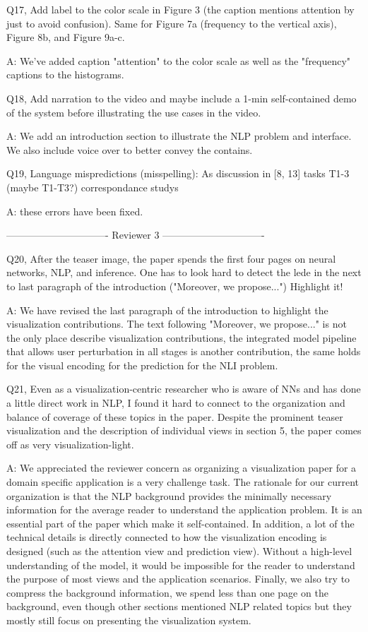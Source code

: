 Q17, Add label to the color scale in Figure 3 (the caption mentions attention by just to avoid confusion). Same for Figure 7a (frequency to the vertical axis), Figure 8b, and Figure 9a-c.

A: We've added caption "attention" to the color scale as well as the "frequency" captions to the histograms.

Q18, Add narration to the video and maybe include a 1-min self-contained demo of the system before illustrating the use cases in the video.

A: We add an introduction section to illustrate the NLP problem and interface. We also include voice over to better convey the contains.

Q19, Language mispredictions (misspelling):
As discussion in [8, 13]
tasks T1-3 (maybe T1-T3?)
correspondance
studys

A: these errors have been fixed.

------------------------------- Reviewer 3 -------------------------------

Q20, After the teaser image, the paper spends the first four pages on neural networks, NLP, and inference. One has to look hard to detect the lede in the next to last paragraph of the introduction ("Moreover, we propose...") Highlight it!

A: We have revised the last paragraph of the introduction to highlight the visualization contributions. The text following "Moreover, we propose..." is not the only place describe visualization contributions, the integrated model pipeline that allows user perturbation in all stages is another contribution, the same holds for the visual encoding for the prediction for the NLI problem.

Q21, Even as a visualization-centric researcher who is aware of NNs and has done a little direct work in NLP, I found it hard to connect to the organization and balance of coverage of these topics in the paper. Despite the prominent teaser visualization and the description of individual views in section 5, the paper comes off as very visualization-light.

A: We appreciated the reviewer concern as organizing a visualization paper for a domain specific application is a very challenge task. The rationale for our current organization is that the NLP background provides the minimally necessary information for the average reader to understand the application problem. It is an essential part of the paper which make it self-contained. In addition, a lot of the technical details is directly connected to how the visualization encoding is designed (such as the attention view and prediction view). Without a high-level understanding of the model, it would be impossible for the reader to understand the purpose of most views and the application scenarios. Finally, we also try to compress the background information, we spend less than one page on the background, even though other sections mentioned NLP related topics but they mostly still focus on presenting the visualization system.


